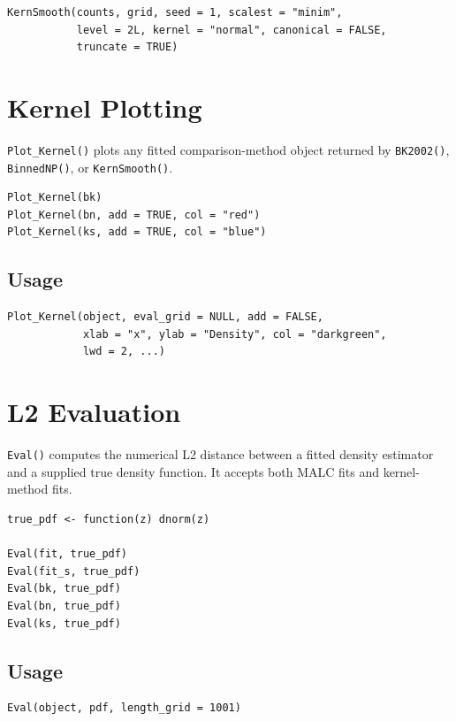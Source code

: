 \documentclass[11pt]{article}
\begin{document}
\begin{lstlisting}
KernSmooth(counts, grid, seed = 1, scalest = "minim",
           level = 2L, kernel = "normal", canonical = FALSE,
           truncate = TRUE)
\end{lstlisting}

\section{Kernel Plotting}

\texttt{Plot\_Kernel()} plots any fitted comparison-method object returned by
\texttt{BK2002()}, \texttt{BinnedNP()}, or \texttt{KernSmooth()}.

\begin{lstlisting}
Plot_Kernel(bk)
Plot_Kernel(bn, add = TRUE, col = "red")
Plot_Kernel(ks, add = TRUE, col = "blue")
\end{lstlisting}

\subsection*{Usage}

\begin{lstlisting}
Plot_Kernel(object, eval_grid = NULL, add = FALSE,
            xlab = "x", ylab = "Density", col = "darkgreen",
            lwd = 2, ...)
\end{lstlisting}

\section{L2 Evaluation}

\texttt{Eval()} computes the numerical L2 distance between a fitted density
estimator and a supplied true density function. It accepts both MALC fits
and kernel-method fits.

\begin{lstlisting}
true_pdf <- function(z) dnorm(z)

Eval(fit, true_pdf)
Eval(fit_s, true_pdf)
Eval(bk, true_pdf)
Eval(bn, true_pdf)
Eval(ks, true_pdf)
\end{lstlisting}

\subsection*{Usage}

\begin{lstlisting}
Eval(object, pdf, length_grid = 1001)
\end{lstlisting}
\end{document}
